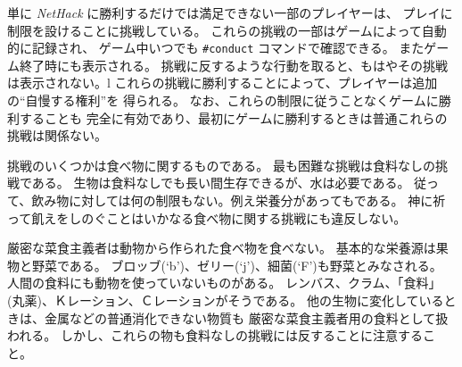 単に {\it NetHack\/} に勝利するだけでは満足できない一部のプレイヤーは、
プレイに制限を設けることに挑戦している。
これらの挑戦の一部はゲームによって自動的に記録され、
ゲーム中いつでも {\tt \#conduct} コマンドで確認できる。
またゲーム終了時にも表示される。
挑戦に反するような行動を取ると、もはやその挑戦は表示されない。l
これらの挑戦に勝利することによって、プレイヤーは追加の``自慢する権利''を
得られる。
なお、これらの制限に従うことなくゲームに勝利することも
完全に有効であり、最初にゲームに勝利するときは普通これらの挑戦は関係ない。

挑戦のいくつかは食べ物に関するものである。
最も困難な挑戦は食料なしの挑戦である。
生物は食料なしでも長い間生存できるが、水は必要である。
従って、飲み物に対しては何の制限もない。例え栄養分があってもである。
神に祈って飢えをしのぐことはいかなる食べ物に関する挑戦にも違反しない。

厳密な菜食主義者は動物から作られた食べ物を食べない。
基本的な栄養源は果物と野菜である。
ブロッブ(`b')、ゼリー(`j')、細菌(`F')も野菜とみなされる。
人間の食料にも動物を使っていないものがある。
レンバス、クラム、「食料」(丸薬)、Ｋレーション、Ｃレーションがそうである。
他の生物に変化しているときは、金属などの普通消化できない物質も
厳密な菜食主義者用の食料として扱われる。
しかし、これらの物も食料なしの挑戦には反することに注意すること。

